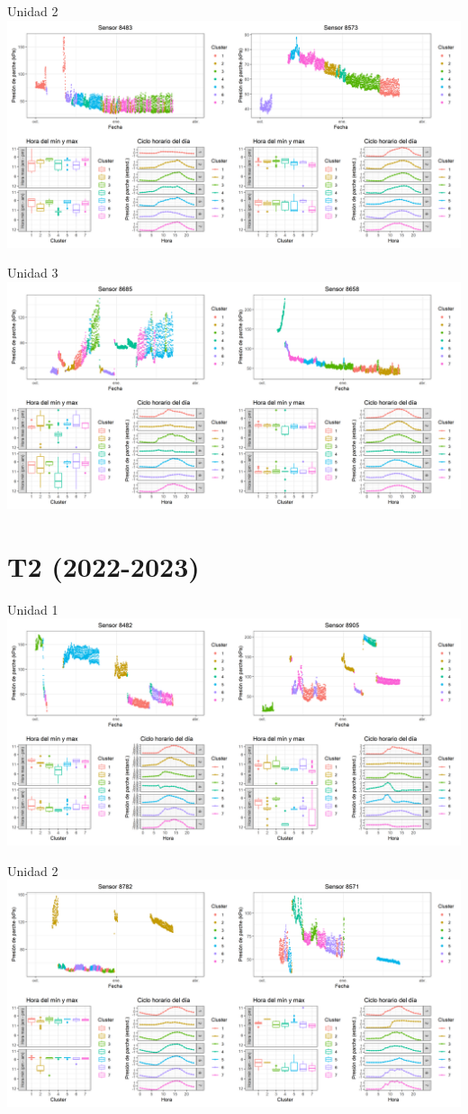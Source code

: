 \documentclass[
  letterpaper,
  DIV=11,
  numbers=noendperiod]{scrreprt}
\begin{document}
Unidad 2
\includegraphics{figuras/01_turgor_sensor/2022_2023_La_Esperanza_T1_Unidad_2.png}

Unidad 3
\includegraphics{figuras/01_turgor_sensor/2022_2023_La_Esperanza_T1_Unidad_3.png}

\chapter{T2 (2022-2023)}

Unidad 1
\includegraphics{figuras/01_turgor_sensor/2022_2023_La_Esperanza_T2_Unidad_1.png}

Unidad 2
\includegraphics{figuras/01_turgor_sensor/2022_2023_La_Esperanza_T2_Unidad_2.png}
\end{document}
